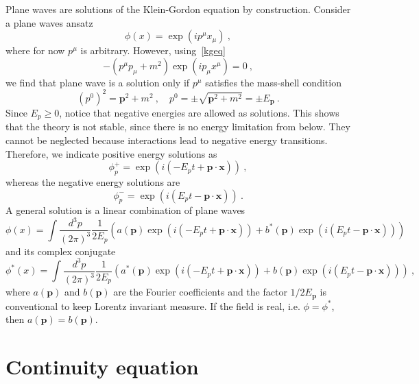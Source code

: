     Plane waves are solutions of the Klein-Gordon equation by construction. Consider a plane waves ansatz 
    \begin{equation*}
        \phi(x) = \exp(i p^\mu x_\mu) ~,
    \end{equation*}
    where for now $p^\mu$ is arbitrary. However, using~\eqref{kgeq}
    \begin{equation*}
        - (p^\mu p_\mu + m^2) \exp(i p_\mu x^\mu) = 0 ~,
    \end{equation*}
    we find that plane wave is a solution only if $p^\mu$ satisfies the mass-shell condition 
    \begin{equation*}
        (p^0)^2 = \mathbf p^2 + m^2 ~, \quad p^0 = \pm \sqrt{\mathbf p^2 + m^2} = \pm E_{\mathbf p} ~.
    \end{equation*}
    Since $E_p \geq 0$, notice that negative energies are allowed as solutions. This shows that the theory is not stable, since there is no energy limitation from below. They cannot be neglected because interactions lead to negative energy transitions. Therefore, we indicate positive energy solutions as  
    \begin{equation*}
        \phi^+_p = \exp(i(-E_p t + \mathbf p \cdot \mathbf x)) ~,
    \end{equation*}
    whereas the negative energy solutions are 
    \begin{equation*}
        \phi^-_p = \exp(i(E_p t - \mathbf p \cdot \mathbf x)) ~.
    \end{equation*}
    A general solution is a linear combination of plane waves 
    \begin{equation*}
        \phi (x) = \int \frac{d^3 p}{(2 \pi)^3} \frac{1}{2 E_p} (a(\mathbf p) \exp(i(-E_p t + \mathbf p \cdot \mathbf x)) + b^*(\mathbf p) \exp(i(E_p t - \mathbf p \cdot \mathbf x)))
    \end{equation*}
    and its complex conjugate
    \begin{equation*}
        \phi^* (x) = \int \frac{d^3 p}{(2 \pi)^3} \frac{1}{2 E_p} (a^* (\mathbf p) \exp(i(-E_p t + \mathbf p \cdot \mathbf x)) + b(\mathbf p) \exp(i(E_p t - \mathbf p \cdot \mathbf x))) ~,
    \end{equation*}
    where $a(\mathbf p)$ and $b(\mathbf p)$ are the Fourier coefficients and the factor $1 / 2 E_{\mathbf p}$ is conventional to keep Lorentz invariant measure. If the field is real, i.e. $\phi = \phi^*$, then $a(\mathbf p) = b(\mathbf p)$.

\section{Continuity equation}

